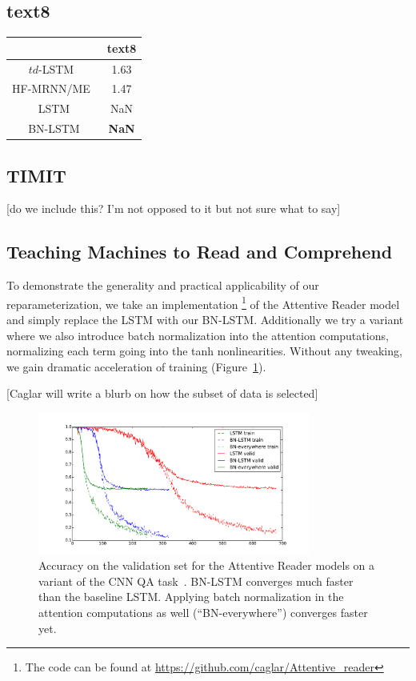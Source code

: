 \documentclass{article} %
\begin{document}
\subsection{text8}

\begin{tabular}{c|c}
  & text8 \\
  \hline
  $td$-LSTM~\cite{zhang2016architectural} & 1.63 \\
  HF-MRNN/ME~\cite{mikolov2012subword} & 1.47 \\
  \hline
  LSTM & NaN \\
  BN-LSTM & \textbf{NaN} \\
\end{tabular}

\subsection{TIMIT}

[do we include this? I'm not opposed to it but not sure what to say]

\subsection{Teaching Machines to Read and Comprehend}

To demonstrate the generality and practical applicability of our
reparameterization, we take an implementation
\footnote{The code can be found at \url{https://github.com/caglar/Attentive_reader}}
of the Attentive Reader model~\cite{attentivereader} and simply replace the LSTM with our
BN-LSTM.
Additionally we try a variant where we also introduce batch
normalization into the attention computations, normalizing each term
going into the tanh nonlinearities.
Without any tweaking, we gain dramatic acceleration of training (Figure~\ref{fig:attr_valid}).

[Caglar will write a blurb on how the subset of data is selected]

\begin{figure}
\center
\includegraphics[width=0.8\textwidth]{figures/attr_valid.pdf}
\caption{
Accuracy on the validation set for the Attentive Reader models on a variant of the CNN QA task~\cite{attentivereader}.
BN-LSTM converges much faster than the baseline LSTM.
Applying batch normalization in the attention computations as well (``BN-everywhere'') converges faster yet.
}
\label{fig:attr_valid}
\end{figure}
\end{document}
